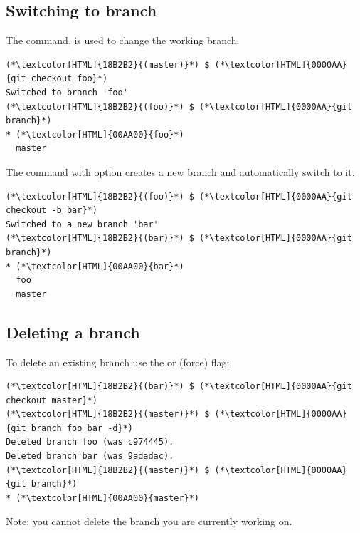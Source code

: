 \subsection{Switching to branch}
\begin{frame}[fragile]
  \subslidetitle
  The  command, is used to change the working branch.
  \begin{lstlisting}
(*\textcolor[HTML]{18B2B2}{(master)}*) $ (*\textcolor[HTML]{0000AA}{git checkout foo}*)
Switched to branch 'foo'
(*\textcolor[HTML]{18B2B2}{(foo)}*) $ (*\textcolor[HTML]{0000AA}{git branch}*)
* (*\textcolor[HTML]{00AA00}{foo}*)
  master
\end{lstlisting}

  The  command with  option creates a new branch and automatically switch to it.
  \begin{lstlisting}
(*\textcolor[HTML]{18B2B2}{(foo)}*) $ (*\textcolor[HTML]{0000AA}{git checkout -b bar}*)
Switched to a new branch 'bar'
(*\textcolor[HTML]{18B2B2}{(bar)}*) $ (*\textcolor[HTML]{0000AA}{git branch}*)
* (*\textcolor[HTML]{00AA00}{bar}*)
  foo
  master
\end{lstlisting}
\end{frame}

\subsection{Deleting a branch}
\begin{frame}[fragile]
  \subslidetitle
  To delete an existing branch use the  or  (force) flag:
\begin{lstlisting}
(*\textcolor[HTML]{18B2B2}{(bar)}*) $ (*\textcolor[HTML]{0000AA}{git checkout master}*)
(*\textcolor[HTML]{18B2B2}{(master)}*) $ (*\textcolor[HTML]{0000AA}{git branch foo bar -d}*)
Deleted branch foo (was c974445).
Deleted branch bar (was 9adadac).
(*\textcolor[HTML]{18B2B2}{(master)}*) $ (*\textcolor[HTML]{0000AA}{git branch}*)
* (*\textcolor[HTML]{00AA00}{master}*)
\end{lstlisting}

  Note: you cannot delete the branch you are currently working on.
\end{frame}


